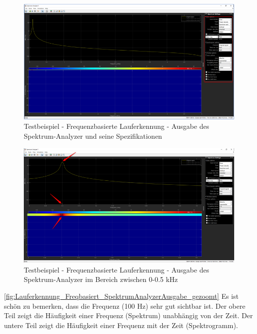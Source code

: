 \begin{figure}[H]
	\centering
	\includegraphics[width=\linewidth]{Bilder/Lauferkennung_Freqbasiert_SpektrumAnalyzerAusgabe.png}
	\caption{Testbeispiel - Frequenzbasierte Lauferkennung - Ausgabe des Spektrum-Analyzer und seine Spezifikationen}
	\label{fig:Lauferkennung_Freqbasiert_SpektrumAnalyzerAusgabe}
\end{figure}

\begin{figure}[H]
	\centering
	\includegraphics[width=\linewidth]{Bilder/Lauferkennung_Freqbasiert_SpektrumAnalyzerAusgabe_gezoomt.png}
	\caption{Testbeispiel - Frequenzbasierte Lauferkennung - Ausgabe des Spektrum-Analyzer im Bereich zwischen 0-0.5 kHz}
	\label{fig:Lauferkennung_Freqbasiert_SpektrumAnalyzerAusgabe_gezoomt}
\end{figure}

\autoref{fig:Lauferkennung_Freqbasiert_SpektrumAnalyzerAusgabe_gezoomt} Es ist schön zu bemerken, dass die Frequenz (100 Hz) sehr gut sichtbar ist. Der obere Teil zeigt die Häufigkeit einer Frequenz (Spektrum) unabhängig von der Zeit. Der untere Teil zeigt die Häufigkeit einer Frequenz mit der Zeit (Spektrogramm).

